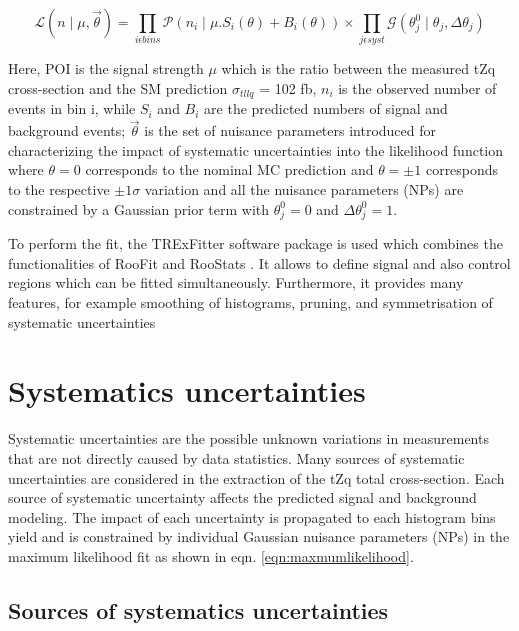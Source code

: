 \begin{equation}
\label{eqn:maxmumlikelihood}
    \mathcal{L} (n \mid \mu, \Vec{\theta} ) = \prod_{i\epsilon bins} \mathcal{P}\left( n_{i} \mid \mu . S_{i}(\theta)+B_{i}(\theta)\right) \times \prod_{j\epsilon syst}\mathcal{G} ( \theta^{0}_{j} \mid \theta_{j}, \Delta \theta_{j} )
\end{equation}

Here, POI is the signal strength $\mu$ which is the ratio between the measured tZq cross-section and the SM prediction $\sigma_{tllq}$ = 102 fb, $n_{i}$ is the observed number of events in bin i, while $S_{i}$ and $B_{i}$ are the predicted numbers of signal and background events; $\Vec{\theta}$ is the set of nuisance parameters introduced for characterizing the impact of systematic uncertainties into the likelihood function  where $\theta = 0$ corresponds to the nominal MC prediction and $\theta = \pm 1$ corresponds to the respective $\pm 1\sigma$ variation and all the nuisance parameters (NPs) are constrained by a Gaussian prior term with $\theta_{j}^{0} = 0$ and $\Delta \theta_{j}^{0} = 1$.


To perform the fit, the TRExFitter software package \cite{trexfitter} is used which combines the functionalities of RooFit \cite{verkerke2003roofit} and RooStats \cite{moneta2011roostats}. It allows to define signal and also control regions which can be fitted simultaneously. Furthermore, it provides many features, for example smoothing of histograms, pruning, and symmetrisation of systematic uncertainties



\section{Systematics uncertainties}
\label{sec:systematics}

Systematic uncertainties are the possible unknown variations in measurements that are not directly caused by data statistics. Many sources of systematic uncertainties are considered in the extraction of the tZq total cross-section. Each source of systematic uncertainty affects the predicted signal and background modeling. The impact of each uncertainty is propagated to each histogram bins yield and is constrained by individual Gaussian nuisance parameters (NPs) in the maximum likelihood fit as shown in eqn. \ref{eqn:maxmumlikelihood}.

\subsection{Sources of systematics uncertainties}


